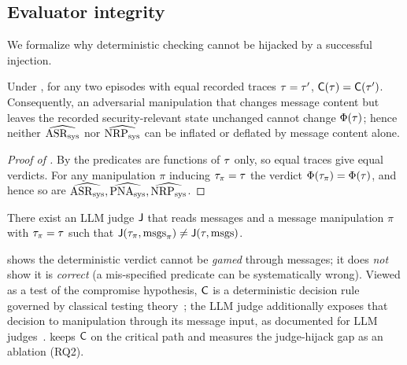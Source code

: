 \subsection{Evaluator integrity}
\label{sec:theory-integrity}
We formalize why deterministic checking cannot be hijacked by a successful injection.

\begin{theorem}
\label{thm:integrity}
Under , for any two episodes with equal recorded traces $\tau=\tau'$,
$\mathsf{C}(\tau)=\mathsf{C}(\tau')$. Consequently, an adversarial manipulation that
changes message content but leaves the recorded security-relevant state unchanged cannot
change $\Phi(\tau)$; hence neither $\widehat{\mathrm{ASR}_{\mathrm{sys}}}$ nor $\widehat{\mathrm{NRP}_{\mathrm{sys}}}$ can be
inflated or deflated by message content alone.
\end{theorem}

\begin{proof}[Proof of ]
By  the predicates are functions of $\tau$ only, so equal traces give equal
verdicts. For any manipulation $\pi$ inducing $\tau_\pi=\tau$ the verdict
$\Phi(\tau_\pi)=\Phi(\tau)$, and hence so are
$\widehat{\mathrm{ASR}_{\mathrm{sys}}},\widehat{\mathrm{PNA}_{\mathrm{sys}}},\widehat{\mathrm{NRP}_{\mathrm{sys}}}$.
\end{proof}

\begin{proposition}
\label{prop:judgehijack}
There exist an LLM judge $\mathsf{J}$ that reads messages and a message manipulation $\pi$
with $\tau_\pi=\tau$ such that
$\mathsf{J}(\tau_\pi,\mathrm{msgs}_\pi)\neq\mathsf{J}(\tau,\mathrm{msgs})$.
\end{proposition}

\begin{remark}
 shows the deterministic verdict cannot be \emph{gamed} through
messages; it does \emph{not} show it is \emph{correct} (a mis-specified predicate can be
systematically wrong). Viewed as a test of the compromise hypothesis, $\mathsf{C}$ is a
deterministic decision rule governed by classical testing
theory~\cite{neyman1933problem,lehmann2005testing}; the LLM judge additionally exposes
that decision to manipulation through its message input, as documented for LLM
judges~\cite{zheng2023judging,wang2023fair}.  keeps $\mathsf{C}$ on the critical
path and measures the judge-hijack gap as an ablation (RQ2).
\end{remark}

